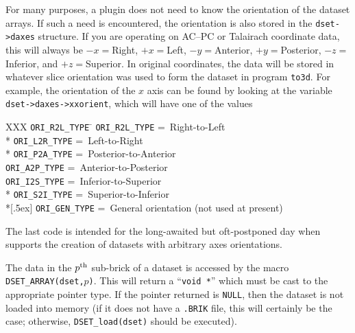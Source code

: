   For many purposes, a plugin does not need to know the orientation of the
  dataset arrays.  If such a need is encountered,
  the orientation is also stored in the {\tt dset->daxes}
  structure.  If you are operating on AC--PC or Talairach coordinate data, this will
  always be $-x={}$Right, $+x={}$Left, $-y={}$Anterior, $+y={}$Posterior,
  $-z={}$Inferior, and $+z={}$Superior.  In original coordinates, the data
  will be stored in whatever slice orientation was used to form the dataset
  in program {\tt to3d}.  For example, the orientation of the $x$ axis can
  be found by looking at the variable {\tt dset->daxes->xxorient},
  which will have one of the values
\begin{tabbing}
  XXX \= {\tt ORI\_R2L\_TYPE} \= \kill
      \> {\tt ORI\_R2L\_TYPE} \> =~Right-to-Left \\*
      \> {\tt ORI\_L2R\_TYPE} \> =~Left-to-Right \\*
      \> {\tt ORI\_P2A\_TYPE} \> =~Posterior-to-Anterior \\
      \> {\tt ORI\_A2P\_TYPE} \> =~Anterior-to-Posterior \\
      \> {\tt ORI\_I2S\_TYPE} \> =~Inferior-to-Superior \\*
      \> {\tt ORI\_S2I\_TYPE} \> =~Superior-to-Inferior \\*[.5ex]
      \> {\tt ORI\_GEN\_TYPE} \> =~General orientation (not used at present)
\end{tabbing}
  The last code is intended for the long-awaited but oft-postponed day when
  \afnit supports the creation of datasets with arbitrary axes orientations.

\label{Subbricks}
  The data in the $p^{\rm th}$ sub-brick of a dataset is accessed by
  the macro {\tt DSET\_ARRAY(dset,$p$)}.  This will return a ``{\tt void *}''
  which must be cast to the appropriate pointer type.  If the pointer
  returned is {\tt NULL}, then the dataset is not loaded into memory
  (if it does not have a {\tt .BRIK} file, this will certainly be the case; otherwise,
   {\tt DSET\_load(dset)} should be executed).

